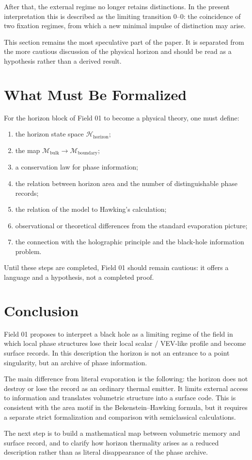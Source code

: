 \documentclass[11pt,a4paper]{article}
\newcommand{\memory}{\mathcal{M}}
\newcommand{\bulk}{\mathrm{bulk}}
\newcommand{\boundary}{\mathrm{boundary}}
\begin{document}
After that, the external regime no longer retains distinctions. In the present interpretation this is described as the limiting transition $0$--$0$: the coincidence of two fixation regimes, from which a new minimal impulse of distinction may arise.

This section remains the most speculative part of the paper. It is separated from the more cautious discussion of the physical horizon and should be read as a hypothesis rather than a derived result.

\section{What Must Be Formalized}

For the horizon block of Field 01 to become a physical theory, one must define:
\begin{enumerate}
\item the horizon state space $\mathcal{H}_{\mathrm{horizon}}$;
\item the map $\memory_{\bulk}\to\memory_{\boundary}$;
\item a conservation law for phase information;
\item the relation between horizon area and the number of distinguishable phase records;
\item the relation of the model to Hawking's calculation;
\item observational or theoretical differences from the standard evaporation picture;
\item the connection with the holographic principle and the black-hole information problem.
\end{enumerate}

Until these steps are completed, Field 01 should remain cautious: it offers a language and a hypothesis, not a completed proof.

\section{Conclusion}

Field 01 proposes to interpret a black hole as a limiting regime of the field in which local phase structures lose their local scalar / VEV-like profile and become surface records. In this description the horizon is not an entrance to a point singularity, but an archive of phase information.

The main difference from literal evaporation is the following: the horizon does not destroy or lose the record as an ordinary thermal emitter. It limits external access to information and translates volumetric structure into a surface code. This is consistent with the area motif in the Bekenstein--Hawking formula, but it requires a separate strict formalization and comparison with semiclassical calculations.

The next step is to build a mathematical map between volumetric memory and surface record, and to clarify how horizon thermality arises as a reduced description rather than as literal disappearance of the phase archive.
\end{document}

